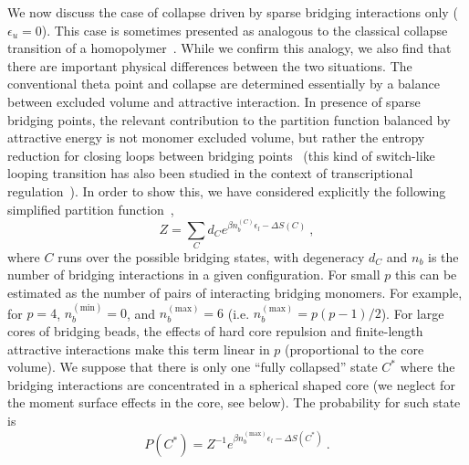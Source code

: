 \documentclass[
preprint,
a4paper,
12pt,
superscriptaddress,
pre]{revtex4}
\begin{document}
%

We now discuss the case of collapse driven by sparse bridging
interactions only ($\epsilon_u = 0$). This case is sometimes presented
as analogous to the classical collapse transition of a
homopolymer~\cite{Barbieri2013a,Junier2010}. While we confirm this
analogy, we also find that there are important physical differences
between the two situations. The conventional theta point and collapse
are determined essentially by a balance between excluded volume and
attractive interaction. In presence of sparse bridging points, the
relevant contribution to the partition function balanced by attractive
energy is not monomer excluded volume, but rather the entropy
reduction for closing loops between bridging
points~\cite{Marenduzzo2006c} (this kind of switch-like looping
transition has also been studied in the context of transcriptional
regulation~\cite{Saiz2006a}). In order to show this, we have
considered explicitly the following simplified partition
function~\cite{Marenduzzo2006c,Saiz2006a},
\begin{equation}
  \label{eq:Zloop}
  Z = \sum_{C} d_C e^{\beta n_b^{(C)} \epsilon_l - \Delta S(C)} \ ,
\end{equation}
where $C$ runs over the possible bridging states, with degeneracy
$d_C$
and $n_b$ is the number of bridging interactions in a given
configuration.  For small $p$ this can be estimated as the number of
pairs of interacting bridging monomers. For example, for $p=4$,
$n_b^{\mathrm{(min)}}=0$, and $n_b^{\mathrm{(max)}}=6$
(i.e. $n_b^{\mathrm{(max)}}=p(p-1)/2$).  For large cores of bridging
beads, the effects of hard core repulsion and finite-length attractive
interactions make this term linear in $p$ (proportional to the core
volume).
%
We suppose that there is only one ``fully collapsed'' state $C^*$
where the bridging interactions are concentrated in a spherical shaped
core (we neglect for the moment surface effects in the core, see
below). The probability for such state is
\begin{equation}
  \label{eq:prob_collapseZ}
  P(C^*) = Z^{-1}  e^{\beta n_b^{\mathrm{(max)}} \epsilon_l - \Delta
    S(C^*)} \ .
\end{equation}
\end{document}
